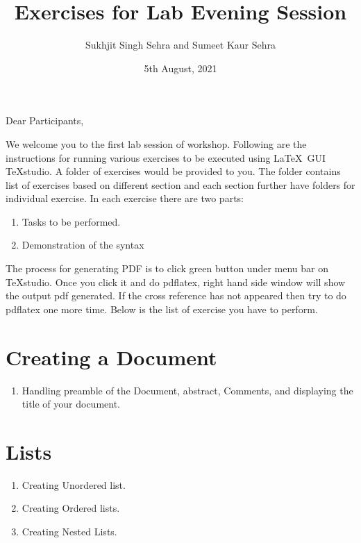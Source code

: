 \documentclass[11pt,a4paper]{article}
\author{Sukhjit Singh Sehra and Sumeet Kaur Sehra}
\title{Exercises for Lab Evening Session}
\date{5th August, 2021}
\begin{document}
\maketitle
Dear Participants,

We welcome you to the  first lab session of workshop. Following are the instructions for running various exercises to be executed using \LaTeX\ GUI \TeX studio. A folder of exercises would be provided to you. The folder contains list of exercises based on different section and each section further have folders for individual exercise. In each exercise there are two parts:
\begin{enumerate}
\item  Tasks to be performed.
\item Demonstration of the syntax
\end{enumerate}

The process for generating PDF is to click green button under menu bar on \TeX studio. Once you click it and do pdflatex, right hand side window will  show the output pdf generated. If the cross reference has not appeared then try to do pdflatex one more time. Below is the list of exercise you have to perform.

 
\section{Creating a Document}
 \begin{enumerate}
 \item Handling preamble of the Document, abstract, Comments, and displaying the title of your document. 
 
 \end{enumerate}
\section{Lists}
 \begin{enumerate}
 \item Creating Unordered list.
 \item Creating Ordered lists.
 \item Creating Nested Lists.
 \end{enumerate}
\end{document}
